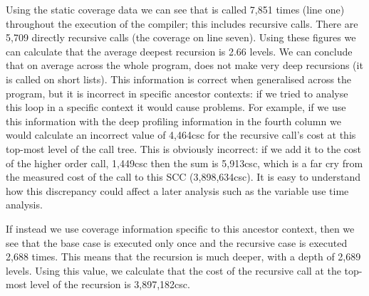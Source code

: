 Using the static coverage data we can see that \foldlthree is called 7,851 times
(line one)
throughout the execution of the compiler;
this includes recursive calls.
There are 5,709 directly recursive calls (the coverage on line seven).
Using these figures we can calculate that the average deepest recursion is
2.66 levels.
We can conclude that on average across the whole program,
\foldlthree does not make very deep recursions
(it is called on short lists).
This information is correct when generalised across the program,
but it is incorrect in specific ancestor contexts:
if we tried to analyse this loop in a specific context it would cause
problems.
For example,
if we use this information with the deep profiling information in the fourth
column we would calculate an incorrect value of 4,464csc for the recursive
call's cost at this top-most level of the call tree.
This is obviously incorrect:
if we add it to the cost of the higher order call, 1,449csc
then the sum is 5,913csc,
which is a far cry from the measured cost of the call to this SCC
(3,898,634csc).
It is easy to understand how this discrepancy could affect a later analysis
such as the variable use time analysis.

If instead we use coverage information specific to this ancestor context,
then we see that the base case is executed only once and the recursive case
is executed 2,688 times.
This means that the recursion is much deeper,
with a depth of 2,689 levels.
Using this value,
we calculate that the cost of the recursive call at the top-most level of
the recursion is
3,897,182csc.

